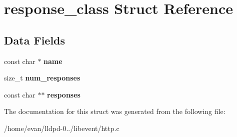 \section{response\-\_\-class \-Struct \-Reference}
\label{structresponse__class}
\subsection*{\-Data \-Fields}
\begin{DoxyCompactItemize}
\item 
const char $\ast$ {\bfseries name}\label{structresponse__class_a8f8f80d37794cde9472343e4487ba3eb}

\item 
size\-\_\-t {\bfseries num\-\_\-responses}\label{structresponse__class_a14b4afdbd9168cd723275572324cd241}

\item 
const char $\ast$$\ast$ {\bfseries responses}\label{structresponse__class_af2efbf5f03c3ebd25946965fa8066f32}

\end{DoxyCompactItemize}


\-The documentation for this struct was generated from the following file\-:\begin{DoxyCompactItemize}
\item 
/home/evan/lldpd-\/0../libevent/http.\-c\end{DoxyCompactItemize}

